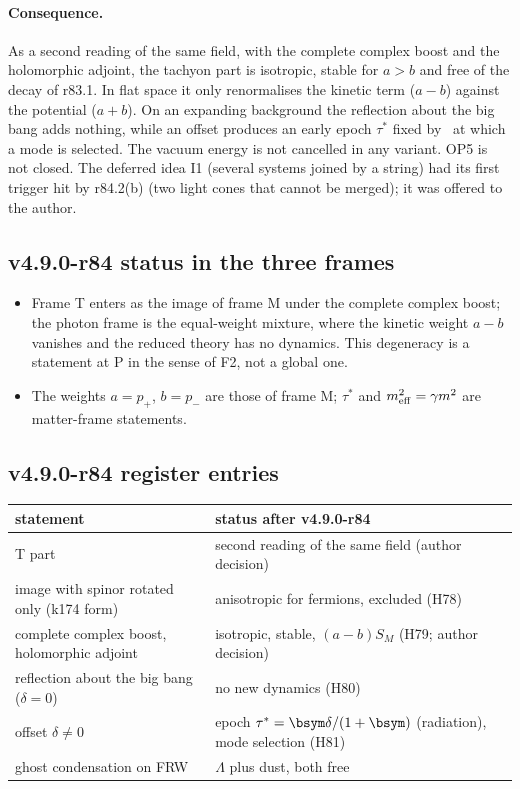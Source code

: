 \paragraph{Consequence.}
As a second reading of the same field, with the complete complex boost and the holomorphic adjoint, the tachyon part is isotropic, stable
for \(a>b\) and free of the decay of r83.1.  In flat space it only renormalises the kinetic term (\(a-b\)) against the potential (\(a+b\)).  On
an expanding background the reflection about the big bang adds nothing, while an offset produces an early epoch \(\tau^*\) fixed by \bsym\
at which a mode is selected.  The vacuum energy is not cancelled in any variant.  OP5 is not closed.  The deferred idea I1 (several
systems joined by a string) had its first trigger hit by r84.2(b) (two light cones that cannot be merged); it was offered to the author.

\subsection*{v4.9.0-r84 status in the three frames}
\label{subsec:v490-r84-frames}

\begin{itemize}[leftmargin=2em]
\item Frame T enters as the image of frame M under the complete complex boost; the photon frame is the equal-weight mixture, where the
kinetic weight \(a-b\) vanishes and the reduced theory has no dynamics.  This degeneracy is a statement at P in the sense of F2, not a
global one.
\item The weights \(a=p_+\), \(b=p_-\) are those of frame M; \(\tau^*\) and \(m_{\rm eff}^2=\gamma m^2\) are matter-frame statements.
\end{itemize}

\subsection*{v4.9.0-r84 register entries}
\label{subsec:v490-r84-register}

\begin{center}
\small
\begin{tabular}{@{}>{\raggedright\arraybackslash}p{}>{\raggedright\arraybackslash}p{}@{}}
\toprule
statement & status after v4.9.0-r84\\
\midrule
T part & second reading of the same field (author decision)\\
image with spinor rotated only (k174 form) & anisotropic for fermions, excluded (H78)\\
complete complex boost, holomorphic adjoint & isotropic, stable, \((a-b)S_M\) (H79; author decision)\\
reflection about the big bang (\(\delta=0\)) & no new dynamics (H80)\\
offset \(\delta\neq0\) & epoch \(\tau^*=\bsym\delta/(1+\bsym)\) (radiation), mode selection (H81)\\
ghost condensation on FRW & \(\Lambda\) plus dust, both free\\
\bottomrule
\end{tabular}
\end{center}

